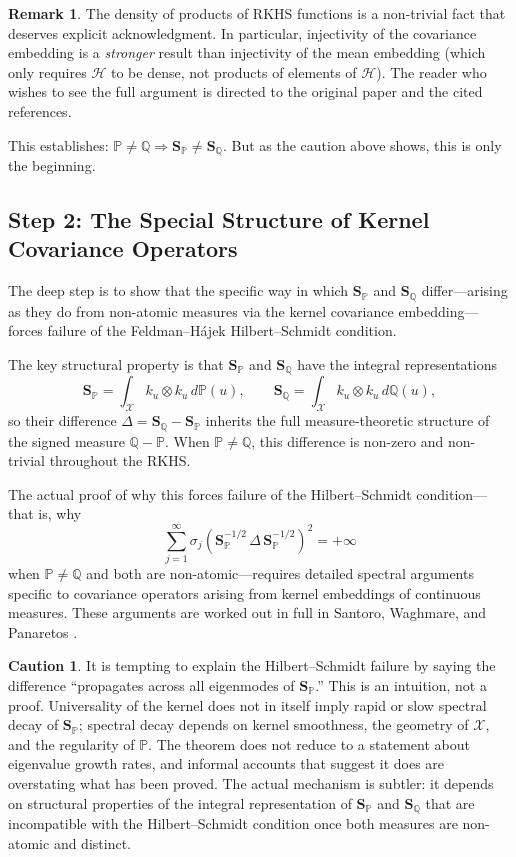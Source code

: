 \documentclass[12pt, oneside]{book}
\theoremstyle{plain}
\theoremstyle{definition}
\newtheorem{caution}[theorem]{Caution}
\newtheorem{remark}[theorem]{Remark}
\newcommand{\calH}{\mathcal{H}}
\newcommand{\calX}{\mathcal{X}}
\newcommand{\PP}{\mathbb{P}}
\newcommand{\QQ}{\mathbb{Q}}
\newcommand{\SP}{\mathbf{S}_{\PP}}
\newcommand{\SQ}{\mathbf{S}_{\QQ}}
\begin{document}
\begin{remark}
The density of products of RKHS functions is a non-trivial fact that deserves explicit acknowledgment. In particular, injectivity of the covariance embedding is a \emph{stronger} result than injectivity of the mean embedding (which only requires $\calH$ to be dense, not products of elements of $\calH$). The reader who wishes to see the full argument is directed to the original paper and the cited references.
\end{remark}

This establishes: $\PP \neq \QQ \Rightarrow \SP \neq \SQ$. But as the caution above shows, this is only the beginning.

\subsection{Step 2: The Special Structure of Kernel Covariance Operators}

The deep step is to show that the specific way in which $\SP$ and $\SQ$ differ---arising as they do from non-atomic measures via the kernel covariance embedding---forces failure of the Feldman--H\'ajek Hilbert--Schmidt condition.

The key structural property is that $\SP$ and $\SQ$ have the integral representations
\begin{equation}
\SP = \int_{\calX} k_u \otimes k_u\, d\PP(u), \qquad \SQ = \int_{\calX} k_u \otimes k_u\, d\QQ(u),
\end{equation}
so their difference $\Delta = \SQ - \SP$ inherits the full measure-theoretic structure of the signed measure $\QQ - \PP$. When $\PP \neq \QQ$, this difference is non-zero and non-trivial throughout the RKHS.

The actual proof of why this forces failure of the Hilbert--Schmidt condition---that is, why
\begin{equation}
\sum_{j=1}^{\infty} \sigma_j\!\left(\SP^{-1/2}\,\Delta\,\SP^{-1/2}\right)^2 = +\infty
\end{equation}
when $\PP \neq \QQ$ and both are non-atomic---requires detailed spectral arguments specific to covariance operators arising from kernel embeddings of continuous measures. These arguments are worked out in full in Santoro, Waghmare, and Panaretos \cite{SantoroPNAS2026}.

\begin{caution}
It is tempting to explain the Hilbert--Schmidt failure by saying the difference ``propagates across all eigenmodes of $\SP$.'' This is an intuition, not a proof. Universality of the kernel does not in itself imply rapid or slow spectral decay of $\SP$; spectral decay depends on kernel smoothness, the geometry of $\calX$, and the regularity of $\PP$. The theorem does not reduce to a statement about eigenvalue growth rates, and informal accounts that suggest it does are overstating what has been proved. The actual mechanism is subtler: it depends on structural properties of the integral representation of $\SP$ and $\SQ$ that are incompatible with the Hilbert--Schmidt condition once both measures are non-atomic and distinct.
\end{caution}
\end{document}

